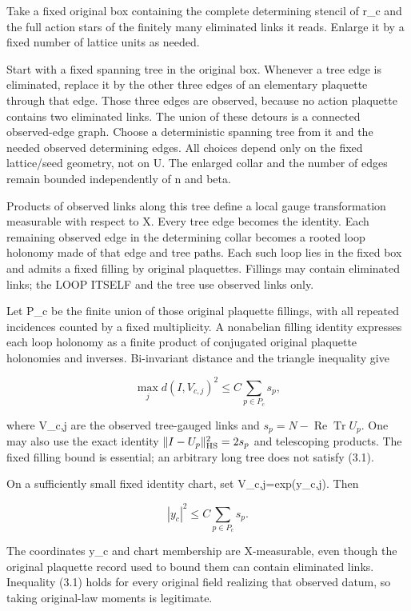 \documentclass[
  11pt,
]{article}
\begin{document}
Take a fixed original box containing the complete determining stencil of
r\_c and the full action stars of the finitely many eliminated links it
reads. Enlarge it by a fixed number of lattice units as needed.

Start with a fixed spanning tree in the original box. Whenever a tree
edge is eliminated, replace it by the other three edges of an elementary
plaquette through that edge. Those three edges are observed, because no
action plaquette contains two eliminated links. The union of these
detours is a connected observed-edge graph. Choose a deterministic
spanning tree from it and the needed observed determining edges. All
choices depend only on the fixed lattice/seed geometry, not on U. The
enlarged collar and the number of edges remain bounded independently of
n and beta.

Products of observed links along this tree define a local gauge
transformation measurable with respect to X. Every tree edge becomes the
identity. Each remaining observed edge in the determining collar becomes
a rooted loop holonomy made of that edge and tree paths. Each such loop
lies in the fixed box and admits a fixed filling by original plaquettes.
Fillings may contain eliminated links; the LOOP ITSELF and the tree use
observed links only.

Let P\_c be the finite union of those original plaquette fillings, with
all repeated incidences counted by a fixed multiplicity. A nonabelian
filling identity expresses each loop holonomy as a finite product of
conjugated original plaquette holonomies and inverses. Bi-invariant
distance and the triangle inequality give

\[
 \max_j d(I,V_{c,j})^2
 \le C\sum_{p\in P_c}s_p,
\tag{3.1}
\]

where V\_c,j are the observed tree-gauged links and
\(s_p=N-\operatorname{Re}\operatorname{Tr}U_p\). One may also use the
exact identity \(\|I-U_p\|_{\rm HS}^2=2s_p\) and telescoping products.
The fixed filling bound is essential; an arbitrary long tree does not
satisfy (3.1).

On a sufficiently small fixed identity chart, set V\_c,j=exp(y\_c,j).
Then

\[
 |y_c|^2\le C\sum_{p\in P_c}s_p.
\tag{3.2}
\]

The coordinates y\_c and chart membership are X-measurable, even though
the original plaquette record used to bound them can contain eliminated
links. Inequality (3.1) holds for every original field realizing that
observed datum, so taking original-law moments is legitimate.
\end{document}
